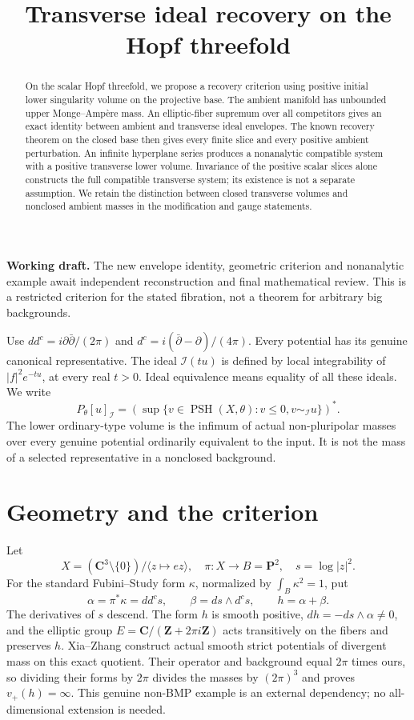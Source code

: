 \documentclass[11pt]{article}
\title{Transverse ideal recovery on the Hopf threefold}
\author{}\date{}
\newcommand{\ddc}{dd^c}
\newcommand{\PSH}{\operatorname{PSH}}
\newcommand{\PI}[2]{P_{#1}[#2]_{\mathcal I}}
\begin{document}
\maketitle
\noindent\textbf{Working draft.} The new envelope identity, geometric
criterion and nonanalytic example await independent reconstruction and
final mathematical review. This is a restricted criterion for the stated
fibration, not a theorem for arbitrary big backgrounds.
\begin{abstract}
On the scalar Hopf threefold, we propose a recovery criterion using
positive initial lower singularity volume on the projective base.
The ambient manifold has unbounded upper Monge--Amp\`ere mass.
An elliptic-fiber supremum over all competitors gives an exact identity
between ambient and transverse ideal envelopes. The known recovery
theorem on the closed base then gives every finite slice and every
positive ambient perturbation. An infinite hyperplane series produces
a nonanalytic compatible system with a positive transverse lower
volume. Invariance of the positive scalar slices alone constructs the
full compatible transverse system; its existence is not a separate
assumption. We retain the distinction between closed transverse volumes
and nonclosed ambient masses in the modification and gauge statements.
\end{abstract}

Use $\ddc=i\partial\bar\partial/(2\pi)$ and
$d^c=i(\bar\partial-\partial)/(4\pi)$. Every potential has its genuine
canonical representative. The ideal $\mathcal I(tu)$ is defined by
local integrability of $|f|^2e^{-tu}$, at every real $t>0$.
Ideal equivalence means equality of all these ideals. We write
\[
 \PI{\theta}{u}
 =\left(\sup\{v\in\PSH(X,\theta):v\leq0,
                         v\sim_{\mathcal I}u\}\right)^*.
\]
The lower ordinary-type volume is the infimum of actual non-pluripolar
masses over every genuine potential ordinarily equivalent to the input.
It is not the mass of a selected representative in a nonclosed background.

\section{Geometry and the criterion}
Let
\[
 X=(\mathbf C^3\setminus\{0\})/\langle z\mapsto ez\rangle,
 \quad \pi:X\longrightarrow B=\mathbf P^2,
 \quad s=\log|z|^2.
\]
For the standard Fubini--Study form $\kappa$, normalized by
$\int_B\kappa^2=1$, put
\[
 \alpha=\pi^*\kappa=\ddc s,\qquad
 \beta=ds\wedge d^c s,\qquad h=\alpha+\beta.
\]
The derivatives of $s$ descend. The form $h$ is smooth positive,
$dh=-ds\wedge\alpha\ne0$, and the elliptic group
$E=\mathbf C/(\mathbf Z+2\pi i\mathbf Z)$ acts transitively on the
fibers and preserves $h$. Xia--Zhang \cite[Theorem 1.1]{XZ} construct
actual smooth strict potentials of divergent mass on this exact quotient.
Their operator and background equal $2\pi$ times ours, so dividing
their forms by $2\pi$ divides the masses by $(2\pi)^3$ and proves
$v_+(h)=\infty$. This genuine non-BMP example is an external dependency;
no all-dimensional extension is needed.
\end{document}
